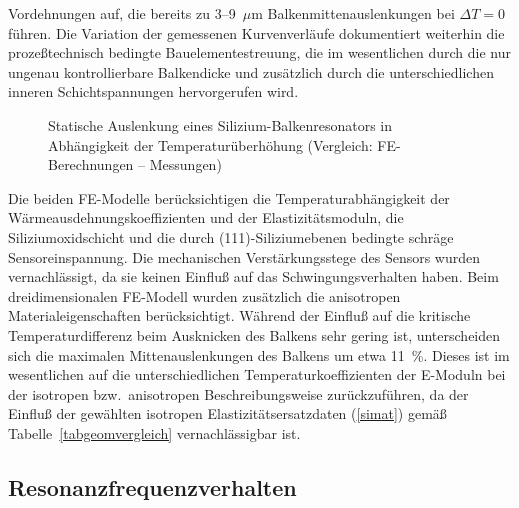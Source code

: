 Vordehnungen auf, die bereits zu 3--9~$\mu$m Balkenmittenauslenkungen bei
$\Delta T = 0$ führen. Die Variation der gemessenen Kurvenverläufe
dokumentiert weiterhin die prozeßtechnisch bedingte Bauelementestreuung,
die im wesentlichen durch die nur
ungenau kontrollierbare Balkendicke und zusätzlich durch die
unterschiedlichen inneren Schichtspannungen hervorgerufen wird.\\
\begin{figure}[htb]
\begin{center}

\setabbvzz
\end{center}
\caption{\label{abbausvgl}
 Statische Auslenkung eines Silizium-Balkenresonators in Abhängigkeit der
 Temperaturüberhöhung (Vergleich: FE-Berechnungen -- Messungen)}
\end{figure}
Die beiden FE-Modelle berücksichtigen die Temperaturabhängigkeit der
Wärmeausdehnungskoeffizienten und der Elastizitätsmoduln, die
Siliziumoxidschicht und die durch (111)-Siliziumebenen bedingte schräge
Sensoreinspannung. Die mechanischen Verstärkungsstege des Sensors wurden
vernachlässigt, da sie keinen Einfluß auf das Schwingungsverhalten haben.
Beim dreidimensionalen FE-Modell wurden zusätzlich die anisotropen
Materialeigenschaften berücksichtigt. Während der Einfluß auf die kritische
Temperaturdifferenz beim Ausknicken des Balkens sehr gering ist,
unterscheiden sich die maximalen Mittenauslenkungen des Balkens um etwa
11~\%. Dieses ist im wesentlichen auf die unterschiedlichen
Temperaturkoeffizienten der E-Moduln bei der isotropen bzw.\
anisotropen Beschreibungsweise zurückzuführen, da der Einfluß der
gewählten isotropen Elastizitätsersatzdaten (\ref{simat}) gemäß
Tabelle~\ref{tabgeomvergleich} vernachlässigbar ist.



\subsection{Resonanzfrequenzverhalten}

